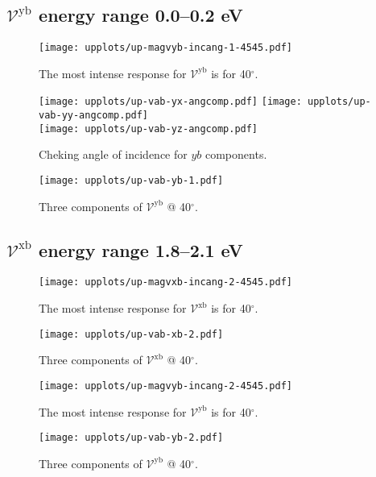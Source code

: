 \documentclass{article}
\let\Oldsubsection\subsection
\renewcommand{\subsection}{\FloatBarrier\Oldsubsection}
\begin{document}
\subsection{$\mathcal{V}^{\mathrm{yb}}$ energy range 0.0--0.2 eV }
\begin{figure}[h]
    \centering
    \texttt{[image: upplots/up-magvyb-incang-1-4545.pdf]}
    \caption{The most intense response for $\mathcal{V}^{\mathrm{yb}} $ is for 
    40$^{\circ}$.}
    \label{fig:up-magvybincang1}
\end{figure}
\begin{figure}[ht]
    \centering
    \texttt{[image: upplots/up-vab-yx-angcomp.pdf]}
    \texttt{[image: upplots/up-vab-yy-angcomp.pdf]}\\
    \texttt{[image: upplots/up-vab-yz-angcomp.pdf]}
    \caption{Cheking angle of incidence for $yb$ components.}
    \label{fig:up-ybangcomp}
\end{figure}
\begin{figure}[ht]
    \centering
    \texttt{[image: upplots/up-vab-yb-1.pdf]}
    \caption{Three components of $\mathcal{V}^{\mathrm{yb}} $ @ 40$^{\circ}$.}
    \label{fig:up-vyb1}
\end{figure}



\subsection{$\mathcal{V}^{\mathrm{xb}}$ energy range 1.8--2.1 eV }


\begin{figure}[h]
    \centering
    \texttt{[image: upplots/up-magvxb-incang-2-4545.pdf]}
    \caption{The most intense response for $\mathcal{V}^{\mathrm{xb}} $ is for 
    40$^{\circ}$.}
    \label{fig:up-magxbincang2}
\end{figure}
\begin{figure}[h]
    \centering
    \texttt{[image: upplots/up-vab-xb-2.pdf]}
    \caption{Three components of $\mathcal{V}^{\mathrm{xb}} $ @ 40$^{\circ}$.}
    \label{fig:up-vxb2}
\end{figure}


\begin{figure}[ht]
    \centering
    \texttt{[image: upplots/up-magvyb-incang-2-4545.pdf]}
    \caption{The most intense response for $\mathcal{V}^{\mathrm{yb}} $ is for 
    40$^{\circ}$.}
    \label{fig:up-magybincang2}
\end{figure}
\begin{figure}[ht]
    \centering
    \texttt{[image: upplots/up-vab-yb-2.pdf]}
    \caption{Three components of $\mathcal{V}^{\mathrm{yb}} $ @ 40$^{\circ}$.}
    \label{fig:upvyb2}
\end{figure}
\end{document}
